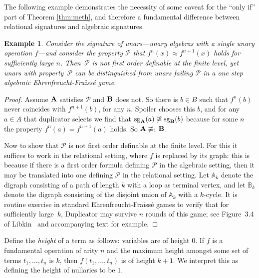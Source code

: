 \documentclass[10pt,a4paper]{amsart}
\theoremstyle{plain}
\newtheorem{example}[thm]{Example}
\theoremstyle{definition}
\newcommand{\sg}[2]{\mathrm{sg}_{#1}(#2)}
\begin{document}
The following example demonstrates the necessity of some caveat for the ``only if'' part of Theorem \ref{thm:meth}, and therefore a fundamental difference between relational signatures and algebraic signatures.
\begin{example}
Consider the signature of \emph{unars}---unary algebras with a single unary operation $f$---and consider the property $\mathcal{P}$ that $f^n(x)\approx f^{n+1}(x)$ holds for sufficiently large $n$.  Then~$\mathcal{P}$ is not first order definable at the finite level, yet unars with property~$\mathcal{P}$ can be distinguished from unars failing  $\mathcal{P}$ in a one step algebraic Ehrenfreucht-Fra\"{\i}ss\'e game.
\end{example}
\begin{proof}
Assume ${\bf A}$ satisfies $\mathcal{P}$ and  ${\bf B}$ does not.  So there is $b\in B$ such that $f^n(b)$ never coincides with $f^{n+1}(b)$, for any $n$.  Spoiler chooses this $b$, and for any $a\in A$ that duplicator selects we find that $\sg{\bf A}{a}\not\cong \sg{\bf B}{b}$ because for some $n$ the property $f^n(a)=f^{n+1}(a)$ holds.  So ${\bf A}\not\equiv_1{\bf B}$.

Now to show that $\mathcal{P}$ is not first order definable at the finite level.  For this it suffices to work in the relational setting, where $f$ is replaced by its graph: this is because if there is a first order formula defining $\mathcal{P}$ in the algebraic setting, then it may be translated into one defining $\mathcal{P}$ in the relational setting.  Let $\mathbb{A}_k$ denote the digraph consisting of a path of length $k$ with a loop as terminal vertex, and let $\mathbb{B}_k$ denote the digraph consisting of the disjoint union of $\mathbb{A}_k$ with a $k$-cycle.  It is routine exercise in standard  Ehrenfreucht-Fra\"{\i}ss\'e games to verify that for sufficiently large~$k$, Duplicator may survive $n$ rounds of this game; see Figure~3.4 of Libkin~\cite{lib} and accompanying text for example.
\end{proof}


Define the \emph{height} of a term as follows: variables are of height $0$.  If $f$ is a fundamental operation of arity $n$ and the maximum height amongst some set of terms $t_1,\dots,t_n$ is $k$, then $f(t_1,\dots,t_n)$ is of height $k+1$.  We interpret this as defining the height of nullaries to be $1$.
\end{document}
